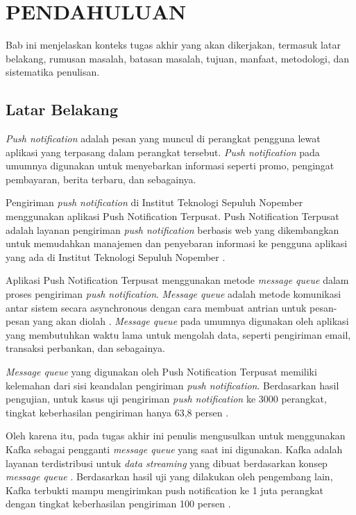\vspace{0ex}
\chapter {PENDAHULUAN}
\par Bab ini menjelaskan konteks tugas akhir yang akan dikerjakan, termasuk latar belakang, rumusan masalah, batasan masalah, tujuan, manfaat, metodologi, dan sistematika penulisan.

\section{Latar Belakang}
\par \textit{Push notification} adalah pesan yang muncul di perangkat pengguna lewat aplikasi yang terpasang dalam perangkat tersebut. \textit{Push notification} pada umumnya digunakan untuk menyebarkan informasi seperti promo, pengingat pembayaran, berita terbaru, dan sebagainya.
\par Pengiriman \textit{push notification} di Institut Teknologi Sepuluh Nopember menggunakan aplikasi Push Notification Terpusat. Push Notification Terpusat adalah layanan pengiriman \textit{push notification} berbasis web yang dikembangkan untuk memudahkan manajemen dan penyebaran informasi ke pengguna aplikasi yang ada di Institut Teknologi Sepuluh Nopember \cite{application-thesis}.
\par Aplikasi Push Notification Terpusat menggunakan metode \textit{message queue} dalam proses pengiriman \textit{push notification}. \textit{Message queue} adalah metode komunikasi antar sistem secara asynchronous dengan cara membuat antrian untuk pesan-pesan yang akan diolah \cite{message-queue-online}. \textit{Message queue} pada umumnya digunakan oleh aplikasi yang membutuhkan waktu lama untuk mengolah data, seperti pengiriman email, transaksi perbankan, dan sebagainya.
\par \textit{Message queue} yang digunakan oleh Push Notification Terpusat memiliki kelemahan dari sisi keandalan pengiriman \textit{push notification}. Berdasarkan hasil pengujian, untuk kasus uji pengiriman \textit{push notification} ke 3000 perangkat, tingkat keberhasilan pengiriman hanya 63,8 persen \cite{application-thesis}.
\par Oleh karena itu, pada tugas akhir ini penulis mengusulkan untuk menggunakan Kafka sebagai pengganti \textit{message queue} yang saat ini digunakan. Kafka adalah layanan terdistribusi untuk \textit{data streaming} yang dibuat berdasarkan konsep \textit{message queue} \cite{kafka-online}. Berdasarkan hasil uji yang dilakukan oleh pengembang lain, Kafka terbukti mampu mengirimkan push notification ke 1 juta perangkat dengan tingkat keberhasilan pengiriman 100 persen \cite{prototype-article}.

